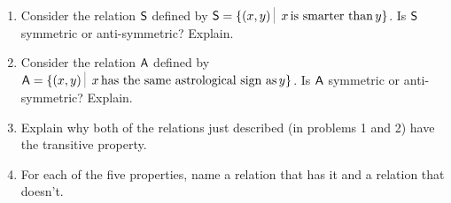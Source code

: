 \begin{enumerate}
\item Consider the relation $\mbox{\textsf S}$ defined by 
$ \relS = \{ (x,y) \suchthat \; x \, \mbox{is smarter than} \, y \}$.
Is $\mbox{\textsf S}$ symmetric or anti-symmetric?  Explain.

\wbvfill

\item Consider the relation $\mbox{\textsf A}$ defined by 
$ \relA = \{ (x,y) \suchthat \; x \, \mbox{has the same astrological sign as} \, y \}$.
Is $\mbox{\textsf A}$ symmetric or anti-symmetric?  Explain.

\wbvfill

\item Explain why both of the relations just described (in problems 1 and 2)
have the transitive property.

\wbvfill

\item For each of the five properties, name a relation that has it
and a relation that doesn't.

\wbvfill

\rule{0pt}{0pt}

\wbvfill

\workbookpagebreak
\end{enumerate} 

